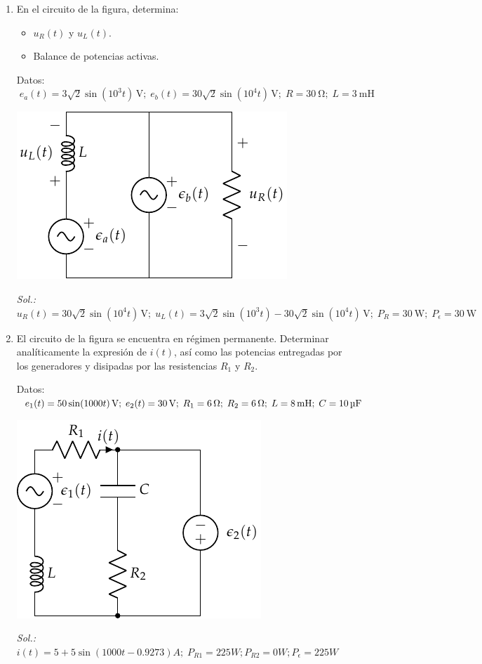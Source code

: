 \begin{enumerate}
\item En el circuito de la figura, determina:
  \begin{itemize}
  \item $u_R(t)$ y $u_L(t)$.
  \item Balance de potencias activas.
  \end{itemize}
  Datos:
  $\; e_a(t) = {3\sqrt{2} \sin(10^3 t)} \,\si{\volt};\;e_b(t) = {30\sqrt{2}
    \sin(10^4 t)}\,\si{\volt};\;R = \qty{30}{\ohm};\;L = \qty{3}{\milli\henry}$
  \begin{center}
    \includegraphics{../figs/superposicion2_ej.pdf}
  \end{center}

  \emph{Sol.:\;
    $u_R(t) = 30\sqrt{2}\sin(10^4 t)\,\si{\volt};\; u_L(t) = 3\sqrt{2}\sin(10^3
    t) - 30\sqrt{2}\sin(10^4 t)\,\si{\volt};\; P_R = \qty{30}{\watt};\; P_\epsilon =
    \qty{30}{\watt}$}

\item El circuito de la figura se encuentra en régimen
  permanente. Determinar analíticamente la expresión de $i(t)$, así
  como las potencias entregadas por los generadores y disipadas por
  las resistencias $R_1$ y $R_2$.

  Datos:
  $\; e_1(t) = \qty[parse-numbers=false]{50 \sin(1000 t)}{\volt};\;
  e_2(t) = \qty{30}{\volt};\;
  R_1 = \qty{6}{\ohm};\;
  R_2 = \qty{6}{\ohm};\;
  L = \qty{8}{\milli\henry};\;
  C = \qty{10}{\micro\farad}$

  \begin{center}
    \includegraphics{../figs/superposicion1_ej.pdf}
  \end{center}
  \emph{Sol.:\;
    $i(t) = 5 + 5\sin(1000t - 0.9273){A};\; P_{R1} = {225}{W}; P_{R2}
    = {0}{W}; P_{\epsilon} = {225}{W}$}


\end{enumerate}
